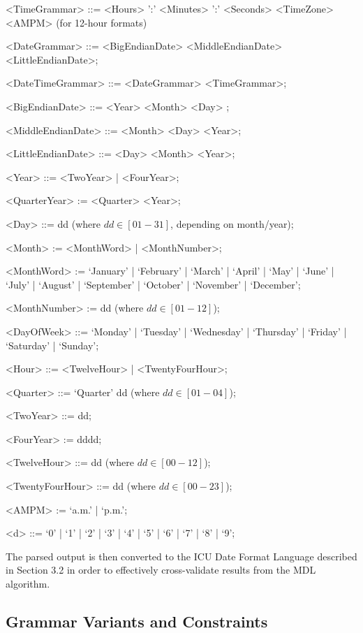 \begin{grammar}
<TimeGrammar> ::= <Hours> ':' <Minutes> ':' <Seconds> <TimeZone> <AMPM> (for 12-hour formats)

<DateGrammar> ::= <BigEndianDate> 
				\alt <MiddleEndianDate> 
				\alt <LittleEndianDate>;

<DateTimeGrammar>  ::= <DateGrammar> 
					\alt <TimeGrammar>;
					

<BigEndianDate> ::= <Year> <Month>  <Day> ;

<MiddleEndianDate> ::= <Month> <Day> <Year>;

<LittleEndianDate> ::= <Day> <Month> <Year>;

<Year> ::= <TwoYear> | <FourYear>;

<QuarterYear> := <Quarter> <Year>;

<Day>     ::= dd (where $dd \in [01-31]$, depending on month/year);

<Month> := <MonthWord> | <MonthNumber>;

<MonthWord> := `January' | `February' | `March' | `April' | `May' | `June' | `July' | `August' | `September' | `October' | `November' | `December';

<MonthNumber> := dd (where $dd \in [01-12]$);

<DayOfWeek> ::= `Monday' | `Tuesday' | `Wednesday' | `Thursday' | `Friday' | `Saturday' | `Sunday';

<Hour> ::= <TwelveHour> | <TwentyFourHour>;

<Quarter> ::= `Quarter' dd (where $dd \in [01 - 04]$);

<TwoYear> ::= dd;

<FourYear> := dddd;

<TwelveHour> ::= dd (where $dd \in [00-12]$);

<TwentyFourHour> ::= dd (where $dd \in [00 -23]$);

<AMPM> := `a.m.' | `p.m.';

<d> ::= `0' | `1' | `2' | `3' | `4' | `5' | `6' | `7' | `8' | `9';

\end{grammar}

The parsed output is then converted to the ICU Date Format Language described in Section 3.2 in order to effectively cross-validate results from the MDL algorithm.

\subsection{Grammar Variants and Constraints}

